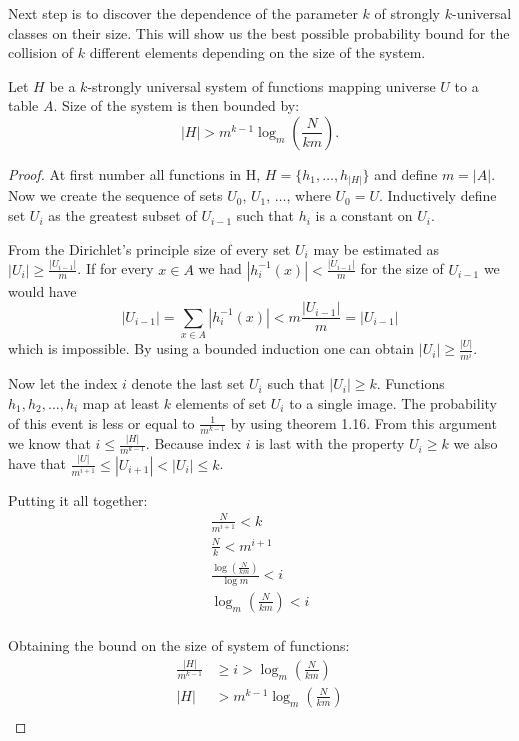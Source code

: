 Next step is to discover the dependence of the parameter $k$ of strongly $k$-universal classes on their size. This will show us the best possible probability bound for the collision of $k$ different elements depending on the size of the system.
\begin{theorem}
Let $H$ be a $k$-strongly universal system of functions mapping universe $U$ to a table $A$. Size of the system is then bounded by:
\begin{displaymath}
|H| > m^{k - 1} \log_m \left( \frac{N}{km} \right) \textit{.}
\end{displaymath}
\end{theorem}
\begin{proof}
At first number all functions in H, $H = \{h_1, \dots, h_{|H|}\}$ and define $m = |A|$. Now we create the sequence of sets $U_0$, $U_1$, $\dots$, where $U_0 = U$. Inductively define set $U_i$ as the greatest subset of $U_{i - 1}$ such that $h_i$ is a constant on $U_i$. 

From the Dirichlet's principle size of every set $U_i$ may be estimated as $|U_i| \geq \frac{|U_{i - 1}|}{m}$. If for every $x \in A$ we had $|\displaystyle h_{i}^{-1}(x)| < \frac{|U_{i - 1}|}{m}$ for the size of $U_{i -1}$ we would have \[|U_{i -1}| = \displaystyle\sum_{x \in A} |\displaystyle h_{i}^{-1}(x)| < m\frac{|U_{i - 1}|}{m} = |U_{i -1}|\] which is impossible. By using a bounded induction one can obtain $|U_i| \geq \frac{|U|}{m^i}$.

Now let the index $i$ denote the last set $U_i$ such that $|U_i| \geq k$. Functions $h_1, h_2,\dots, h_i$ map at least $k$ elements of set $U_i$ to a single image. The probability of this event is less or equal to $\frac{1}{m ^ {k - 1}}$ by using theorem 1.16. From this argument we know that $i \leq \frac{|H|}{m ^ {k - 1}}$. Because index $i$ is last with the property $U_i \geq k$ we also have that $\frac{|U|}{m ^ {i + 1}} \leq |U_{i + 1}| < |U_i| \leq k$. 

Putting it all together:
\begin{gather*}
\frac{N}{m^{i + 1}} < k \\
\frac{N}{k} < m ^ {i + 1} \\
\frac{\log \left( \frac{N}{km} \right)}{\log m} < i \\
\log_m \left( \frac{N}{km} \right) < i \\
\end{gather*}

Obtaining the bound on the size of system of functions:
\begin{displaymath}
\begin{split}
\frac{|H|}{m^{k - 1}} & \geq i > \log_m \left( \frac{N}{km} \right) \\
|H| & > m^{k - 1} \log_m \left( \frac{N}{km} \right) \\
\end{split}
\end{displaymath}
\end{proof}

